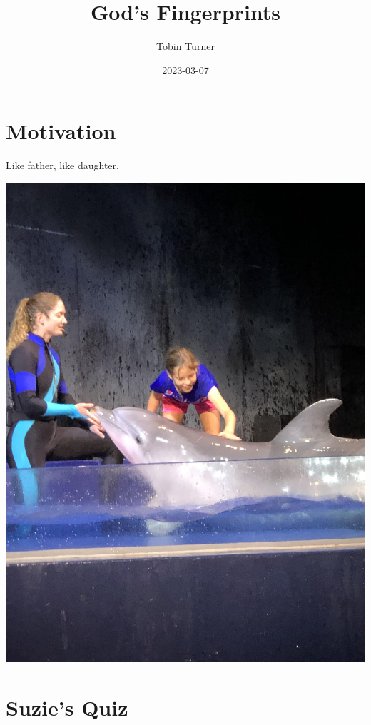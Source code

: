 \documentclass[
]{book}
\title{God's Fingerprints}
\author{Tobin Turner}
\date{2023-03-07}
\begin{document}
\maketitle

{
\setcounter{tocdepth}{1}
\tableofcontents
}
\hypertarget{motivation}{%
\chapter{Motivation}\label{motivation}}

Like father, like daughter.

\begin{center}\includegraphics[width=1\linewidth]{_images/meredith} \end{center}

\hypertarget{suzies-quiz}{%
\chapter{Suzie's Quiz}\label{suzies-quiz}}
\end{document}
